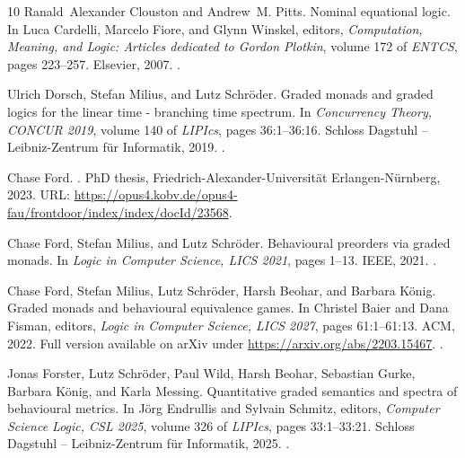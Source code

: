 \documentclass[11pt,a4paper]{amsart}
\theoremstyle{plain}
\numberwithin{equation}{section}
\newcommand{\+}[1]{\mathcal{#1}\xspace}
\theoremstyle{definition}
\begin{document}
\begin{thebibliography}{10}
Ranald~Alexander Clouston and Andrew~M. Pitts.
\newblock Nominal equational logic.
\newblock In Luca Cardelli, Marcelo Fiore, and Glynn Winskel, editors, {\em
  Computation, Meaning, and Logic: Articles dedicated to Gordon Plotkin},
  volume 172 of {\em ENTCS}, pages 223--257. Elsevier, 2007.
\newblock \href {https://doi.org/10.1016/J.ENTCS.2007.02.009}
  {}.

Ulrich Dorsch, Stefan Milius, and Lutz Schr{\"{o}}der.
\newblock Graded monads and graded logics for the linear time - branching time
  spectrum.
\newblock In {\em Concurrency Theory, CONCUR 2019}, volume 140 of {\em LIPIcs},
  pages 36:1--36:16. Schloss Dagstuhl -- Leibniz-Zentrum f{\"u}r Informatik,
  2019.
\newblock \href {https://doi.org/10.4230/LIPIcs.CONCUR.2019.36}
  {}.

Chase Ford.
.
\newblock PhD thesis, Friedrich-Alexander-Universität Erlangen-Nürnberg,
  2023.
\newblock URL:
  \url{https://opus4.kobv.de/opus4-fau/frontdoor/index/index/docId/23568}.

Chase Ford, Stefan Milius, and Lutz Schr{\"{o}}der.
\newblock Behavioural preorders via graded monads.
\newblock In {\em Logic in Computer Science, {LICS} 2021}, pages 1--13. {IEEE},
  2021.
\newblock \href {https://doi.org/10.1109/LICS52264.2021.9470517}
  {}.

Chase Ford, Stefan Milius, Lutz Schr{\"{o}}der, Harsh Beohar, and Barbara
  K{\"{o}}nig.
\newblock Graded monads and behavioural equivalence games.
\newblock In Christel Baier and Dana Fisman, editors, {\em Logic in Computer
  Science, LICS 2027}, pages 61:1--61:13. {ACM}, 2022.
\newblock Full version available on arXiv under
  {\url{https://arxiv.org/abs/2203.15467}}.
\newblock \href {https://doi.org/10.1145/3531130.3533374}
  {}.

Jonas Forster, Lutz Schr{\"{o}}der, Paul Wild, Harsh Beohar, Sebastian Gurke,
  Barbara K{\"{o}}nig, and Karla Messing.
\newblock Quantitative graded semantics and spectra of behavioural metrics.
\newblock In J{\"{o}}rg Endrullis and Sylvain Schmitz, editors, {\em Computer
  Science Logic, {CSL} 2025}, volume 326 of {\em LIPIcs}, pages 33:1--33:21.
  Schloss Dagstuhl -- Leibniz-Zentrum f{\"u}r Informatik, 2025.
\newblock \href {https://doi.org/10.4230/LIPICS.CSL.2025.33}
  {}.


\end{thebibliography}
\end{document}
